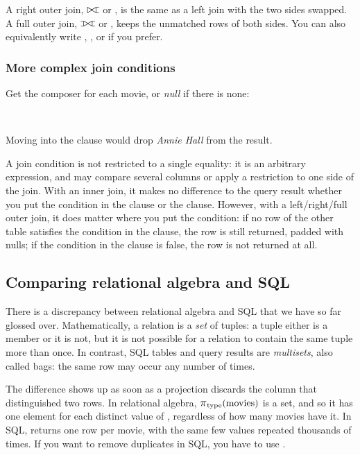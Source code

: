 A right outer join, $\rabin{\routerjoin}$ or , is the same as a left join with the two sides swapped.
A full outer join, $\rabin{\fouterjoin}$ or , keeps the unmatched rows of both sides.
You can also equivalently write , , or  if you prefer.

\begin{frame}
    \label{s:join-condition}
    \frametitle{More complex join conditions}
    Get the composer for each movie, or \emph{null} if there is none:
    \inputminted[fontsize=\footnotesize]{sql}{code/sql-join-cond.sql}
    \vspace{0.4em}
    {\footnotesize}\\[0.8em]\pause
    Moving  into the  clause
    would drop \emph{Annie Hall} from the result.
\end{frame}
\label{l:join-condition}

A join condition is not restricted to a single equality: it is an arbitrary expression, and may compare several columns or apply a restriction to one side of the join.
With an inner join, it makes no difference to the query result whether you put the condition in the  clause or the  clause.
However, with a left/right/full outer join, it does matter where you put the condition: if no row of the other table satisfies the condition in the  clause, the row is still returned, padded with nulls; if the condition in the  clause is false, the row is not returned at all.


\subsection{Comparing relational algebra and SQL}\label{sec:algebra-sql}

There is a discrepancy between relational algebra and SQL that we have so far glossed over.
Mathematically, a relation is a \emph{set} of tuples: a tuple either is a member or it is not, but it is not possible for a relation to contain the same tuple more than once.
In contrast, SQL tables and query results are \emph{multisets}, also called bags: the same row may occur any number of times.

The difference shows up as soon as a projection discards the column that distinguished two rows.
In relational algebra, $\raop{\pi}_{\ra{type}}(\ra{movies})$ is a set, and so it has one element for each distinct value of , regardless of how many movies have it.
In SQL,  returns one row per movie, with the same few values repeated thousands of times.
If you want to remove duplicates in SQL, you have to use .

